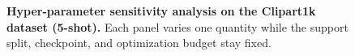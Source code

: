 \begin{figure}[t]
    \centering
    \caption{\textbf{Hyper-parameter sensitivity analysis on the Clipart1k dataset (5-shot).} Each panel varies one quantity while the support split, checkpoint, and optimization budget stay fixed.}
    \label{fig:hyperparam}
\end{figure}
